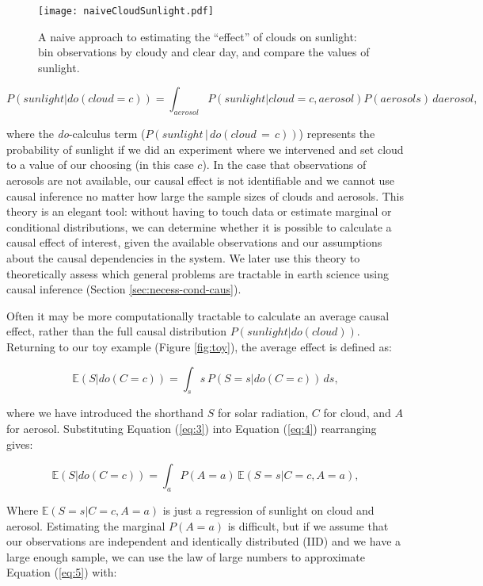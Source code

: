 \documentclass[12pt]{article}
\begin{document}
\begin{figure}
  \texttt{[image: naiveCloudSunlight.pdf]}
  \caption{A naive approach to estimating the ``effect'' of clouds on
    sunlight: bin observations by cloudy and clear day, and compare
    the values of sunlight.}
  \label{fig:naive-cloud-sunlight}
\end{figure}

\begin{equation}
  P(sunlight | do(cloud = c)) = \int_{aerosol} P(sunlight| cloud = c,
  aerosol) P(aerosols) \, d aerosol,
  \label{eq:3}
\end{equation}

where the \textit{do}-calculus \citep{pearl2009} term
($P(sunlight \, | \, do(cloud\, = \,c))$) represents the probability of
sunlight if we did an experiment where we intervened and set cloud to
a value of our choosing (in this case $c$). In the case that
observations of aerosols are not available, our causal effect is not
identifiable and we cannot use causal inference no matter how large
the sample sizes of clouds and aerosols. This theory is an elegant
tool: without having to touch data or estimate marginal or conditional
distributions, we can determine whether it is possible to calculate a
causal effect of interest, given the available observations and our
assumptions about the causal dependencies in the system. We later use
this theory to theoretically assess which general problems are
tractable in earth science using causal inference (Section
\ref{sec:necess-cond-caus}).

Often it may be more computationally tractable to calculate an average
causal effect, rather than the full causal distribution
$P(sunlight | do(cloud))$. Returning to our toy example (Figure
\ref{fig:toy}), the average effect is defined as:

\begin{equation}
  \mathbb{E}(S | do(C = c)) = \int_{s} s \, P(S = s
  | do(C=c)) \, ds,
  \label{eq:4}
\end{equation}

where we have introduced the shorthand $S$ for solar radiation, $C$
for cloud, and $A$ for aerosol. Substituting Equation (\ref{eq:3})
into Equation (\ref{eq:4}) rearranging gives:

\begin{equation}
  \mathbb{E}(S | do(C = c))  = \int_{a} P(A=a) \, \mathbb{E}(S=s |
  C=c, A=a),
  \label{eq:5}
\end{equation}

Where $\mathbb{E}(S=s | C=c, A=a)$ is just a regression of sunlight on
cloud and aerosol. Estimating the marginal $P(A=a)$ is difficult, but
if we assume that our observations are independent and identically
distributed (IID) and we have a large enough sample, we can use the
law of large numbers to approximate Equation (\ref{eq:5}) with:
\end{document}
